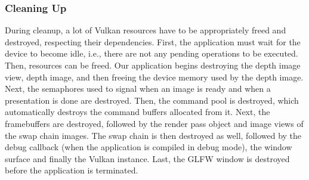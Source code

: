 \subsubsection{Cleaning Up}
During cleanup, a lot of Vulkan resources have to be appropriately freed and destroyed, respecting their dependencies. First, the application must wait for the device to become idle, i.e., there are not any pending operations to be executed. Then, resources can be freed. Our application begins destroying the depth image view, depth image, and then freeing the device memory used by the depth image. Next, the semaphores used to signal when an image is ready and when a presentation is done are destroyed. Then, the command pool is destroyed, which automatically destroys the command buffers allocated from it. Next, the framebuffers are destroyed, followed by the render pass object and image views of the swap chain images. The swap chain is then destroyed as well, followed by the debug callback (when the application is compiled in debug mode), the window surface and finally the Vulkan instance. Last, the GLFW window is destroyed before the application is terminated.
